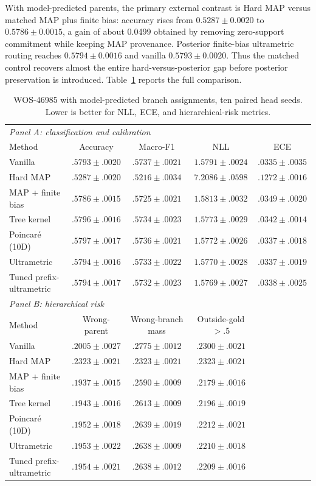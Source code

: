 \documentclass[preprint,11pt]{elsarticle}
\begin{document}
With model-predicted parents, the primary external contrast is Hard MAP versus matched MAP plus finite bias: accuracy rises from $0.5287\pm0.0020$ to $0.5786\pm0.0015$, a gain of about 0.0499 obtained by removing zero-support commitment while keeping MAP provenance. Posterior finite-bias ultrametric routing reaches $0.5794\pm0.0016$ and vanilla $0.5793\pm0.0020$. Thus the matched control recovers almost the entire hard-versus-posterior gap before posterior preservation is introduced. Table~\ref{tab:wos} reports the full comparison.

\begin{table}[H]
\centering
\caption{WOS-46985 with model-predicted branch assignments, ten paired head seeds. Lower is better for NLL, ECE, and hierarchical-risk metrics.}
\label{tab:wos}
\scriptsize
\begin{tabular}{lcccc}
\toprule
\multicolumn{5}{l}{\textit{Panel A: classification and calibration}}\\
Method & Accuracy & Macro-F1 & NLL & ECE\\
\midrule
Vanilla & $.5793\pm.0020$ & $.5737\pm.0021$ & $1.5791\pm.0024$ & $.0335\pm.0035$\\
Hard MAP & $.5287\pm.0020$ & $.5216\pm.0034$ & $7.2086\pm.0598$ & $.1272\pm.0016$\\
MAP + finite bias & $.5786\pm.0015$ & $.5725\pm.0021$ & $1.5813\pm.0032$ & $.0349\pm.0020$\\
Tree kernel & $.5796\pm.0016$ & $.5734\pm.0023$ & $1.5773\pm.0029$ & $.0342\pm.0014$\\
Poincar\'e (10D) & $.5797\pm.0017$ & $.5736\pm.0021$ & $1.5772\pm.0026$ & $.0337\pm.0018$\\
Ultrametric & $.5794\pm.0016$ & $.5733\pm.0022$ & $1.5770\pm.0028$ & $.0337\pm.0019$\\
Tuned prefix-ultrametric & $.5794\pm.0017$ & $.5732\pm.0023$ & $1.5769\pm.0027$ & $.0338\pm.0025$\\
\midrule
\multicolumn{5}{l}{\textit{Panel B: hierarchical risk}}\\
Method & Wrong-parent & Wrong-branch mass & Outside-gold $>.5$ & \\
\midrule
Vanilla & $.2005\pm.0027$ & $.2775\pm.0012$ & $.2300\pm.0021$ & \\
Hard MAP & $.2323\pm.0021$ & $.2323\pm.0021$ & $.2323\pm.0021$ & \\
MAP + finite bias & $.1937\pm.0015$ & $.2590\pm.0009$ & $.2179\pm.0016$ & \\
Tree kernel & $.1943\pm.0016$ & $.2613\pm.0009$ & $.2196\pm.0019$ & \\
Poincar\'e (10D) & $.1952\pm.0018$ & $.2639\pm.0019$ & $.2212\pm.0021$ & \\
Ultrametric & $.1953\pm.0022$ & $.2638\pm.0009$ & $.2210\pm.0018$ & \\
Tuned prefix-ultrametric & $.1954\pm.0021$ & $.2638\pm.0012$ & $.2209\pm.0016$ & \\
\bottomrule
\end{tabular}
\end{table}
\end{document}
